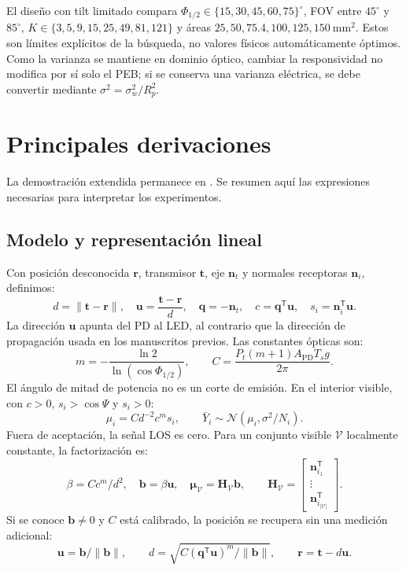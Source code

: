 \documentclass[11pt,a4paper]{article}
\begin{document}
El diseño con tilt limitado compara $\Phi_{1/2}\in\{15,30,45,60,75\}^\circ$, FOV entre $45^\circ$ y $85^\circ$, $K\in\{3,5,9,15,25,49,81,121\}$ y áreas $25,50,75.4,100,125,150\ \mathrm{mm}^2$. Estos son límites explícitos de la búsqueda, no valores físicos automáticamente óptimos. Como la varianza se mantiene en dominio óptico, cambiar la responsividad no modifica por sí solo el PEB; si se conserva una varianza eléctrica, se debe convertir mediante $\sigma^2=\sigma_w^2/R_p^2$.

\section{Principales derivaciones}
La demostración extendida permanece en . Se resumen aquí las expresiones necesarias para interpretar los experimentos.

\subsection{Modelo y representación lineal}
Con posición desconocida $\mathbf r$, transmisor $\mathbf t$, eje $\mathbf n_t$ y normales receptoras $\mathbf n_i$, definimos:
\begin{equation}
d=\|\mathbf t-\mathbf r\|,\quad \mathbf u=\frac{\mathbf t-\mathbf r}{d},\quad
\mathbf q=-\mathbf n_t,\quad c=\mathbf q^{\mathsf T}\mathbf u,\quad s_i=\mathbf n_i^{\mathsf T}\mathbf u.
\end{equation}
La dirección $\mathbf u$ apunta del PD al LED, al contrario que la dirección de propagación usada en los manuscritos previos. Las constantes ópticas son:
\begin{equation}
m=-\frac{\ln2}{\ln(\cos\Phi_{1/2})},\qquad
C=\frac{P_t(m+1)A_{\mathrm{PD}}T_sg}{2\pi}.
\end{equation}
El ángulo de mitad de potencia no es un corte de emisión. En el interior visible, con $c>0$, $s_i>\cos\Psi$ y $s_i>0$:
\begin{equation}
\mu_i=C d^{-2}c^m s_i,\qquad
\bar Y_i\sim\mathcal N(\mu_i,\sigma^2/N_i).
\label{eq:report_model}
\end{equation}
Fuera de aceptación, la señal LOS es cero. Para un conjunto visible $\mathcal V$ localmente constante, la factorización es:
\begin{equation}
\beta=Cc^m/d^2,\quad \mathbf b=\beta\mathbf u,\quad
\bm\mu_{\mathcal V}=\mathbf H_{\mathcal V}\mathbf b,\qquad
\mathbf H_{\mathcal V}=\begin{bmatrix}\mathbf n_{i_1}^{\mathsf T}\\\vdots\\\mathbf n_{i_{|\mathcal V|}}^{\mathsf T}\end{bmatrix}.
\end{equation}
Si se conoce $\mathbf b\ne0$ y $C$ está calibrado, la posición se recupera sin una medición adicional:
\begin{equation}
\mathbf u=\mathbf b/\|\mathbf b\|,\qquad
d=\sqrt{C(\mathbf q^{\mathsf T}\mathbf u)^m/\|\mathbf b\|},\qquad
\mathbf r=\mathbf t-d\mathbf u.
\label{eq:report_inverse}
\end{equation}
\end{document}
